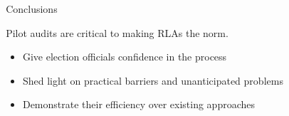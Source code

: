 \documentclass[final]{beamer}
\newlength{\sepwid}
\newlength{\onecolwid}
\newlength{\twocolwid}
\begin{document}
\begin{frame}[t]
\begin{columns}[t]
\begin{column}{\twocolwid}
\begin{columns}[t,totalwidth=\twocolwid]
\begin{column}{\onecolwid}

\end{column} %

\end{columns} %

%

\end{column} %

\begin{column}{\sepwid}\end{column} %

\begin{column}{\onecolwid} %


\begin{block}{Conclusions}

Pilot audits are critical to making RLAs the norm.

\begin{itemize}
\item Give election officials confidence in the process
\item Shed light on practical barriers and unanticipated problems
\item Demonstrate their efficiency over existing approaches
\end{itemize}
\end{block}



\end{column}
\end{columns}
\end{frame}
\end{document}
